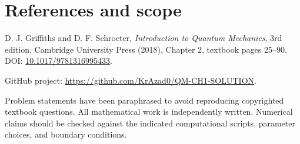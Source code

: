 \documentclass[11pt,a4paper]{article}
\numberwithin{equation}{section}
\begin{document}
\section*{References and scope}
\begin{enumerate}[label={[\arabic*]},leftmargin=16pt]
\item D. J. Griffiths and D. F. Schroeter,
\textit{Introduction to Quantum Mechanics}, 3rd edition, Cambridge
University Press (2018), Chapter 2, textbook pages 25--90.
DOI: \href{https://doi.org/10.1017/9781316995433}{10.1017/9781316995433}.
\item GitHub project: \url{https://github.com/KrAzad0/QM-CH1-SOLUTION}.
\end{enumerate}
Problem statements have been paraphrased to avoid reproducing copyrighted
textbook questions. All mathematical work is independently written.
Numerical claims should be checked against the indicated computational
scripts, parameter choices, and boundary conditions.
\end{document}
